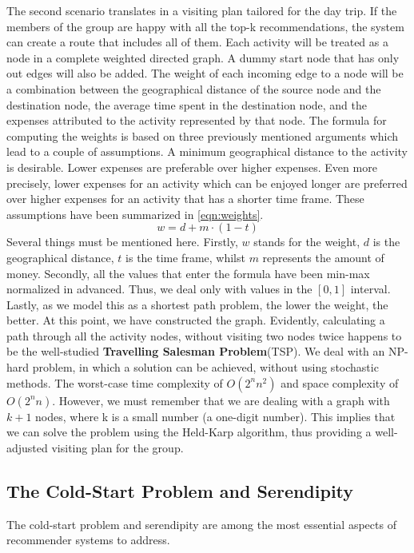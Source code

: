 \documentclass[11pt,a4paper,oneside]{article}
\begin{document}
The second scenario translates in a visiting plan tailored for the day trip. If the members of the group are happy with all the top-k recommendations, the system can create a route that includes all of them. Each activity will be treated as a node in a complete weighted directed graph. A dummy start node that has only out edges will also be added. The weight of each incoming edge to a node will be a combination between the geographical distance of the source node and the destination node, the average time spent in the destination node, and the expenses attributed to the activity represented by that node. The formula for computing the weights is based on three previously mentioned arguments which lead to a couple of assumptions. A minimum geographical distance to the activity is desirable. Lower expenses are preferable over higher expenses. Even more precisely, lower expenses for an activity which can be enjoyed longer are preferred over higher expenses for an activity that has a shorter time frame. These assumptions have been summarized in \autoref{eqn:weights}.
\begin{equation}
    \label{eqn:weights}
    w = d + m \cdot (1 - t)
\end{equation}
Several things must be mentioned here. Firstly, $w$ stands for the weight, $d$ is the geographical distance, $t$ is the time frame, whilst $m$ represents the amount of money. Secondly, all the values that enter the formula have been min-max normalized in advanced. Thus, we deal only with values in the $[0, 1]$ interval. Lastly, as we model this as a shortest path problem, the lower the weight, the better. At this point, we have constructed the graph. Evidently, calculating a path through all the activity nodes, without visiting two nodes twice happens to be the well-studied \textbf{Travelling Salesman Problem}(TSP). We deal with an NP-hard problem, in which a solution can be achieved, without using stochastic methods. The worst-case time complexity of $O(2^nn^2)$ and space complexity of $O(2^nn)$. However, we must remember that we are dealing with a graph with $k+1$ nodes, where k is a small number (a one-digit number). This implies that we can solve the problem using the Held-Karp algorithm, thus providing a well-adjusted visiting plan for the group.\cite{held_DynamicProgrammingApproach_1962}

\subsection{The Cold-Start Problem and Serendipity}
The cold-start problem and serendipity are among the most essential aspects of recommender systems to address. 
\end{document}
